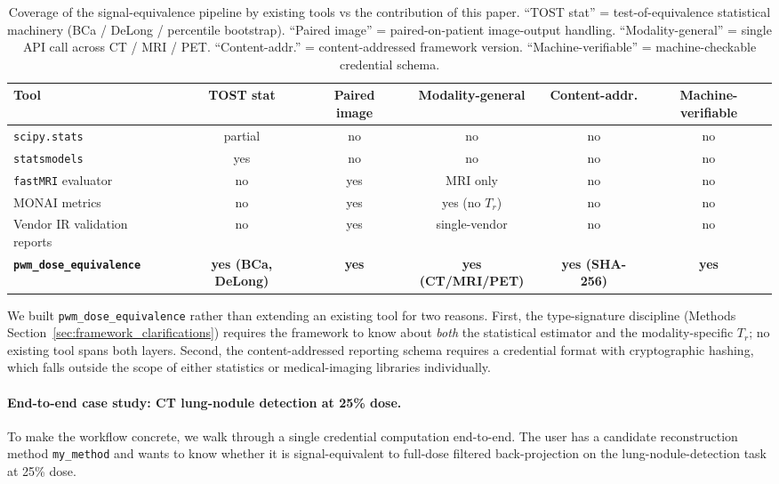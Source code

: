 \documentclass[twoside,11pt]{article}
\begin{document}
\begin{table}[ht]
    \centering
    \small
    \setlength{\tabcolsep}{4pt}
    \begin{tabular}{lccccc}
        \toprule
        \textbf{Tool} & \textbf{TOST stat} & \textbf{Paired image} & \textbf{Modality-general} & \textbf{Content-addr.} & \textbf{Machine-verifiable} \\
        \midrule
        \texttt{scipy.stats}~\citep{virtanen2020scipy}     & partial & no  & no  & no  & no \\
        \texttt{statsmodels}~\citep{seabold2010statsmodels} & yes     & no  & no  & no  & no \\
        \texttt{fastMRI} evaluator~\citep{fastmri}          & no      & yes & MRI only & no & no \\
        MONAI metrics~\citep{cardoso2022monai}              & no      & yes & yes (no $T_r$) & no & no \\
        Vendor IR validation reports                        & no      & yes & single-vendor & no & no \\
        \textbf{\texttt{pwm\_dose\_equivalence}}            & \textbf{yes (BCa, DeLong)} & \textbf{yes} & \textbf{yes (CT/MRI/PET)} & \textbf{yes (SHA-256)} & \textbf{yes} \\
        \bottomrule
    \end{tabular}
    \caption{Coverage of the signal-equivalence pipeline by existing tools vs the contribution of this paper. ``TOST stat'' = test-of-equivalence statistical machinery (BCa / DeLong / percentile bootstrap). ``Paired image'' = paired-on-patient image-output handling. ``Modality-general'' = single API call across CT / MRI / PET. ``Content-addr.'' = content-addressed framework version. ``Machine-verifiable'' = machine-checkable credential schema.}
    \label{tab:tool_comparison}
\end{table}

We built \texttt{pwm\_dose\_equivalence} rather than extending an existing tool for two reasons. First, the type-signature discipline (Methods Section~\ref{sec:framework_clarifications}) requires the framework to know about \emph{both} the statistical estimator and the modality-specific $T_r$; no existing tool spans both layers. Second, the content-addressed reporting schema requires a credential format with cryptographic hashing, which falls outside the scope of either statistics or medical-imaging libraries individually.

\paragraph{End-to-end case study: CT lung-nodule detection at 25\% dose.} To make the workflow concrete, we walk through a single credential computation end-to-end. The user has a candidate reconstruction method \texttt{my\_method} and wants to know whether it is signal-equivalent to full-dose filtered back-projection on the lung-nodule-detection task at 25\% dose.
\end{document}
